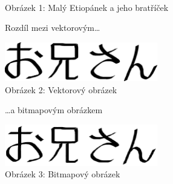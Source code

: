 \documentclass[a4paper, 11pt]{article}
\begin{document}
\begin{center}
	\\
	Obrázek 1: Malý Etiopánek a jeho bratříček
\end{center}

\pagebreak
\thispagestyle{plain}
\clearpage

Rozdíl mezi vektorovým\dots\\
\begin{center}
	\includegraphics[width=0.5\textwidth]{oniisan.eps}\\
	Obrázek 2: Vektorový obrázek
\end{center}
\smallskip
\dots a bitmapovým obrázkem\\
\begin{center}
	\includegraphics[width=0.5\textwidth]{oniisan2.eps}\\
	Obrázek 3: Bitmapový obrázek
\end{center}
\end{document}
